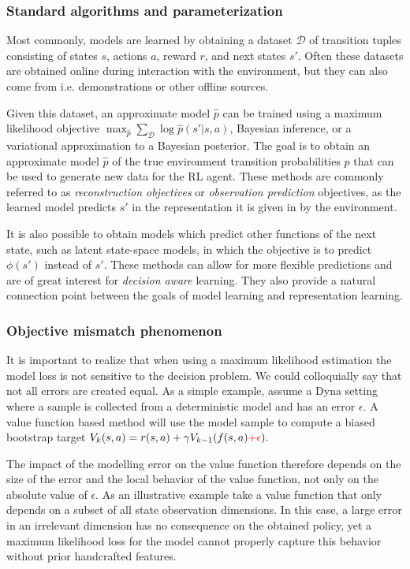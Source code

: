 \subsubsection{Standard algorithms and parameterization}

Most commonly, models are learned by obtaining a dataset $\mathcal{D}$ of transition tuples consisting of states $s$, actions $a$, reward $r$, and next states $s'$. 
Often these datasets are obtained online during interaction with the environment, but they can also come from i.e. demonstrations or other offline sources.

Given this dataset, an approximate model $\hat{p}$ can be trained using a maximum likelihood objective $\max_{\hat{p}} \sum_\mathcal{D} \log \hat{p}(s'|s,a)$, Bayesian inference, or a variational approximation to a Bayesian posterior.
The goal is to obtain an approximate model $\hat{p}$ of the true environment transition probabilities $p$ that can be used to generate new data for the RL agent.
These methods are commonly referred to as \emph{reconstruction objectives} or \emph{observation prediction} objectives, as the learned model predicts $s'$ in the representation it is given in by the environment.

It is also possible to obtain models which predict other functions of the next state, such as latent state-space models, in which the objective is to predict $\phi(s')$ instead of $s'$.
These methods can allow for more flexible predictions and are of great interest for \emph{decision aware} learning.
They also provide a natural connection point between the goals of model learning and representation learning.

\subsubsection{Objective mismatch phenomenon}

It is important to realize that when using a maximum likelihood estimation the model loss is not sensitive to the decision problem.
We could colloquially say that not all errors are created equal.
As a simple example, assume a Dyna setting where a sample is collected from a deterministic model and has an error $\epsilon$.
A value function based method will use the model sample to compute a biased bootstrap target
$
V_k(s,a) = r(s,a) + \gamma V_{k-1}(f(s, a) {\color{red} + \epsilon}).
$

The impact of the modelling error on the value function therefore depends on the size of the error and the local behavior of the value function, not only on the absolute value of $\epsilon$. 
As an illustrative example take a value function that only depends on a subset of all state observation dimensions. 
In this case, a large error in an irrelevant dimension has no consequence on the obtained policy, yet a maximum likelihood loss for the model cannot properly capture this behavior without prior handcrafted features.

